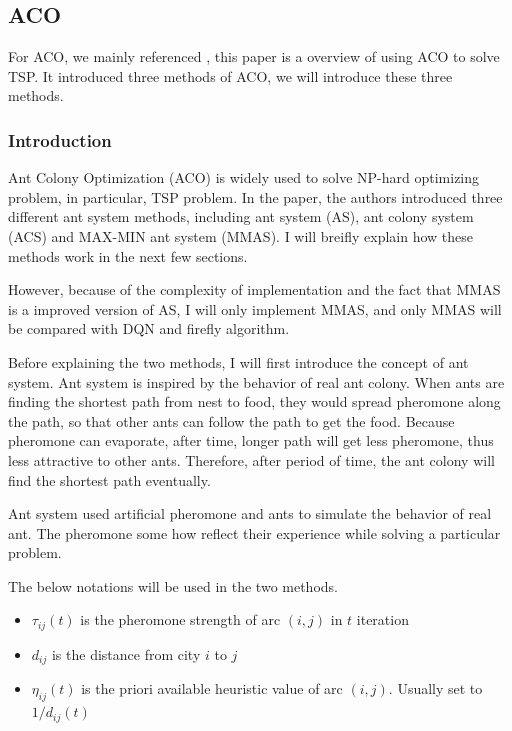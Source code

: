\documentclass[twocolumn, a4paper]{extarticle}
\begin{document}
\subsection{ACO}

For ACO, we mainly referenced \cite{stutzle1999aco}, this paper is a overview of using ACO to solve TSP. It introduced three methods of ACO, we will introduce these three methods.

\subsubsection{Introduction}
Ant Colony Optimization (ACO) is widely used to solve NP-hard optimizing problem, in particular, TSP problem. In the paper, the authors introduced three different ant system methods, including ant system (AS), ant colony system (ACS) and MAX-MIN ant system (MMAS). I will breifly explain how these methods work in the next few sections.

However, because of the complexity of implementation and the fact that MMAS is a improved version of AS, I will only implement MMAS, and only MMAS will be compared with DQN and firefly algorithm.

Before explaining the two methods, I will first introduce the concept of ant system. Ant system is inspired by the behavior of real ant colony. When ants are finding the shortest path from nest to food, they would spread pheromone along the path, so that other ants can follow the path to get the food. Because pheromone can evaporate, after time, longer path will get less pheromone, thus less attractive to other ants. Therefore, after period of time, the ant colony will find the shortest path eventually. 

Ant system used artificial pheromone and ants to simulate the behavior of real ant. The pheromone some how reflect their experience while solving a particular problem.

The below notations will be used in the two methods.

\begin{itemize}
	\item $\tau_{ij}(t)$ is the pheromone strength of arc $(i, j)$ in $t$ iteration
	\item $d_{ij}$ is the distance from city $i$ to $j$
	\item $\eta_{ij}(t)$ is the priori available heuristic value of arc $(i, j)$. Usually set to $1/d_{ij}(t)$
\end{itemize}
\end{document}
